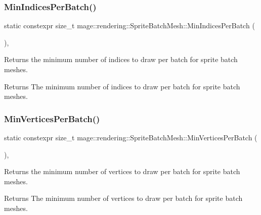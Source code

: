 \subsubsection{\texorpdfstring{Min\+Indices\+Per\+Batch()}{MinIndicesPerBatch()}}
{\footnotesize\ttfamily static constexpr size\+\_\+t mage\+::rendering\+::\+Sprite\+Batch\+Mesh\+::\+Min\+Indices\+Per\+Batch (\begin{DoxyParamCaption}{ }\end{DoxyParamCaption})\hspace{0.3cm}{\ttfamily [static]}, {\ttfamily [noexcept]}}

Returns the minimum number of indices to draw per batch for sprite batch meshes.

\begin{DoxyReturn}{Returns}
The minimum number of indices to draw per batch for sprite batch meshes. 
\end{DoxyReturn}
\hypertarget{classmage_1_1rendering_1_1_sprite_batch_mesh_ad45b804c25e3b488aa9b22226fbc1ed4}{}\label{classmage_1_1rendering_1_1_sprite_batch_mesh_ad45b804c25e3b488aa9b22226fbc1ed4} 
\subsubsection{\texorpdfstring{Min\+Vertices\+Per\+Batch()}{MinVerticesPerBatch()}}
{\footnotesize\ttfamily static constexpr size\+\_\+t mage\+::rendering\+::\+Sprite\+Batch\+Mesh\+::\+Min\+Vertices\+Per\+Batch (\begin{DoxyParamCaption}{ }\end{DoxyParamCaption})\hspace{0.3cm}{\ttfamily [static]}, {\ttfamily [noexcept]}}

Returns the minimum number of vertices to draw per batch for sprite batch meshes.

\begin{DoxyReturn}{Returns}
The minimum number of vertices to draw per batch for sprite batch meshes. 
\end{DoxyReturn}
\hypertarget{classmage_1_1rendering_1_1_sprite_batch_mesh_a7855038d3367c62dcbb2d3227cdb5c81}{}\label{classmage_1_1rendering_1_1_sprite_batch_mesh_a7855038d3367c62dcbb2d3227cdb5c81} 
